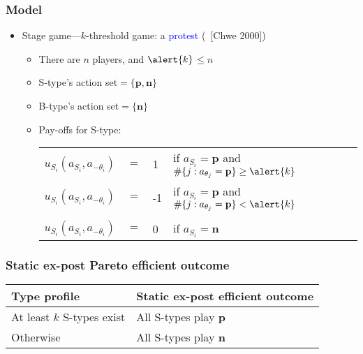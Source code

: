 \documentclass[8pt]{beamer}
\begin{document}
\begin{frame}
  \frametitle{Model}

  \begin{itemize}

  \item Stage game---\alert{$k$}-threshold game: a \textcolor{blue}{protest} (~[Chwe 2000])




\begin{itemize}\pause
\item There are $n$ players, and $\alert{k}$$\leq n$ \pause
\item S-type's action set$=\{\textbf{p},\textbf{n}\}$
\item B-type's action set$=\{\textbf{n}\}$
\item Pay-offs for S-type:
\begin{table}[h]
\begin{tabular}{llll}
$u_{S_i}(a_{S_i},a_{-\theta_i})$ & $=$ & 1 & if $a_{S_i}=\textbf{p}$ and $\#\{j:a_{\theta_j}=\textbf{p}\}\geq \alert{k}$ \\
$u_{S_i}(a_{S_i},a_{-\theta_i})$ & $=$ & -1 & if $a_{S_i}=\textbf{p}$ and $\#\{j:a_{\theta_j}=\textbf{p}\}< \alert{k}$ \\
\\
$u_{S_i}(a_{S_i},a_{-\theta_i})$ & $=$ & 0 & if $a_{S_i}=\textbf{n}$ 
\end{tabular}

\end{table}
\end{itemize}
  

 \end{itemize}

\end{frame}



\begin{frame}
  \frametitle{Static ex-post Pareto efficient outcome}



\begin{table}[h]
\begin{tabular}{ll}
Type profile & Static ex-post efficient outcome \\
\hline
At least $k$ S-types exist & All S-types play \textbf{p}  \\
Otherwise &  All S-types play \textbf{n} 
\end{tabular}
\end{table}
\end{frame}
\end{document}

